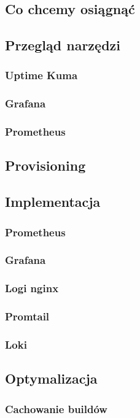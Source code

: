 \documentclass{article}
\begin{document}
\subsection{Co chcemy osiągnąć}
\subsection{Przegląd narzędzi}
\subsubsection{Uptime Kuma}
\subsubsection{Grafana}
\subsubsection{Prometheus}
\subsection{Provisioning}

\subsection{Implementacja}
\subsubsection{Prometheus}
\subsubsection{Grafana}
\subsubsection{Logi nginx}
\subsubsection{Promtail}
\subsubsection{Loki}

\subsection{Optymalizacja}
\subsubsection{Cachowanie buildów}
\end{document}
